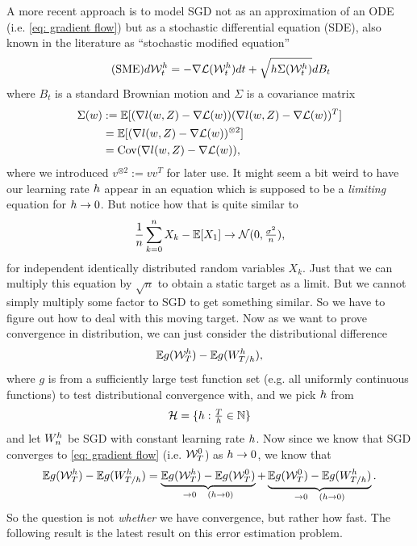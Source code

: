 A more recent approach is to model SGD not as an approximation of an ODE (i.e.
\ref{eq: gradient flow}) but as a stochastic differential equation (SDE), also
known in the literature as ``stochastic modified equation''
\begin{align}
	\tag{SME}
	d\mathcal{W}_t^{h}
	= -\nabla\mathcal{L}(\mathcal{W}_t^{h})dt
	+ \sqrt{h \Sigma(\mathcal{W}_t^{h})}dB_t
\end{align}
where \(B_t\) is a standard Brownian motion and \(\Sigma\) is a covariance
matrix
\begin{align*}
	\Sigma(w)
	&:= \mathbb{E}[(\nabla l(w,Z) - \nabla\mathcal{L}(w))(\nabla l(w,Z) - \nabla\mathcal{L}(w))^T]\\
	&= \mathbb{E}[(\nabla l(w,Z) - \nabla\mathcal{L}(w))^{\otimes 2}]\\
	&= \text{Cov}(\nabla l(w,Z) - \nabla\mathcal{L}(w)),
\end{align*}
%
where we introduced \(v^{\otimes 2}:=vv^T\) for later use. It might seem
a bit weird to have our learning rate \(h\) appear in an equation which is
supposed to be a \emph{limiting} equation for \(h\to 0\). But notice how that
is quite similar to
\begin{align*}
	\frac{1}n\sum_{k=0}^n X_k - \mathbb{E}[X_1] \to \mathcal{N}(0, \tfrac{\sigma^2}{n}),
\end{align*}
for independent identically distributed random variables \(X_k\).
Just that we can multiply this equation by \(\sqrt{n}\) to obtain a static 
target as a limit. But we cannot simply multiply some factor to SGD to get
something similar. So we have to figure out how to deal with this moving target.
Now as we want to prove convergence in distribution, we can just consider the
distributional difference
\begin{align*}
	\mathbb{E} g(\mathcal{W}_T^{h}) - \mathbb{E} g(W^{h}_{T/h}),
\end{align*}
where \(g\) is from a sufficiently large test function set (e.g. all uniformly continuous functions)
to test distributional convergence with, and we pick \(h\) from
\begin{align*}
	\mathcal{H} = \{h : \tfrac{T}{h} \in \mathbb{N}\}
\end{align*}
and let \(W_n^{h}\) be SGD with constant learning rate \(h\). Now
since we know that SGD converges to \ref{eq: gradient flow} (i.e.
\(\mathcal{W}^{0}_T\)) as \(h\to 0\), we know that 
\begin{align*}
	\mathbb{E} g(\mathcal{W}_T^{h}) - \mathbb{E} g(W^{h}_{T/h})
	= \underbrace{
		\mathbb{E} g(\mathcal{W}_T^{h}) - \mathbb{E} g(\mathcal{W}_T^0)
	}_{\to 0 \quad (h\to 0)}
	+ \underbrace{
		\mathbb{E} g(\mathcal{W}_T^0) - \mathbb{E} g(W^{h}_{T/h})
	}_{\to 0 \quad (h\to 0)}.
\end{align*}
So the question is not \emph{whether} we have convergence, but rather how fast.
The following result is the latest result on this error estimation problem.


